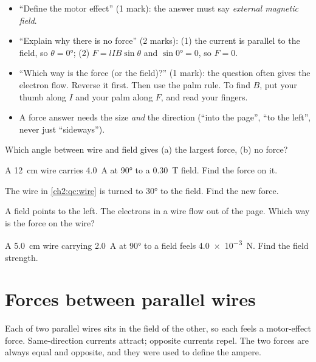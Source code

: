 \begin{examtip}
\begin{itemize}
  \item ``Define the motor effect'' (1 mark): the answer must say \emph{external magnetic field}.
  \item ``Explain why there is no force'' (2 marks): (1) the current is parallel to the field, so
        $\theta = \ang{0}$; (2) $F = lIB\sin\theta$ and $\sin\ang{0} = 0$, so $F = 0$.
  \item ``Which way is the force (or the field)?'' (1 mark): the question often gives the electron
        flow. Reverse it first. Then use the palm rule. To find $B$, put your thumb along $I$ and
        your palm along $F$, and read your fingers.
  \item A force answer needs the size \emph{and} the direction (``into the page'', ``to the
        left'', never just ``sideways'').
\end{itemize}
\end{examtip}

\begin{quickcheck}
  \item Which angle between wire and field gives (a) the largest force, (b) no force?
  \item A \qty{12}{cm} wire carries \qty{4.0}{A} at \ang{90} to a \qty{0.30}{T} field. Find the
        force on it.\label{ch2:qc:wire}
  \item The wire in \cref{ch2:qc:wire} is turned to \ang{30} to the field. Find the new force.
  \item A field points to the left. The electrons in a wire flow out of the page. Which way is
        the force on the wire?
  \item A \qty{5.0}{cm} wire carrying \qty{2.0}{A} at \ang{90} to a field feels \qty{4.0e-3}{N}.
        Find the field strength.
\end{quickcheck}

\section{Forces between parallel wires}\label{ch2:sec:wires}

\begin{bigidea}
Each of two parallel wires sits in the field of the other, so each feels a motor-effect force.
Same-direction currents attract; opposite currents repel. The two forces are always equal and
opposite, and they were used to define the ampere.
\end{bigidea}


